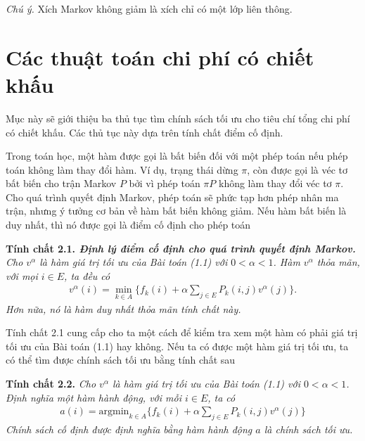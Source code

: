 \documentclass[12pt,a4paper]{report}
\begin{document}
   \textit{Chú ý.} Xích Markov không giảm là xích chỉ có một lớp liên thông.
  
	\chapter{Các thuật toán chi phí có chiết khấu}	
    Mục này sẽ giới thiệu ba thủ tục tìm chính sách tối ưu cho tiêu chí tổng chi phí có chiết khấu. Các thủ tục này dựa trên tính chất điểm cố định.
    
    Trong toán học, một hàm được gọi là bất biến đối với một phép toán nếu phép toán không làm thay đổi hàm. Ví dụ, trạng thái dừng $\pi$, còn được gọi là véc tơ bất biến cho trận Markov $P$ bởi vì phép toán $\pi P$ không làm thay đổi véc tơ $\pi$. Cho quá trình quyết định Markov, phép toán sẽ phức tạp hơn phép nhân ma trận, nhưng ý tưởng cơ bản về hàm bất biến không giảm. Nếu hàm bất biến là duy nhất, thì nó được gọi là điểm cố định cho phép toán 
    
    \medskip
    \begin{shaded*}
    	\noindent
     \noindent
    \textbf{Tính chất 2.1. \textit{Định lý điểm cố định cho quá trình quyết định Markov.}}\textit{ Cho $v^\alpha$ là hàm giá trị tối ưu của Bài toán (1.1) với $0<\alpha<1$. Hàm $v^\alpha$ thỏa mãn, với mọi $i \in E$, ta đều có
    	\begin{align}
    	v^\alpha (i)=\underset{k \in A} {\min }\{f_k(i)+\alpha \sum_{j \in E}P_k(i,j)v^\alpha(j)\} .
    	\end{align} 
    	Hơn nữa, nó là hàm duy nhất thỏa mãn tính chất này.}
    \end{shaded*}
   
    
    \medskip
    Tính chất 2.1 cung cấp cho ta một cách để kiểm tra xem một hàm có phải giá trị tối ưu của Bài toán (1.1) hay không. Nếu ta có được một hàm giá trị tối ưu, ta có thể tìm được chính sách tối ưu bằng tính chất sau
    
    
    \medskip
    \begin{shaded*}
    \noindent
   \textbf{Tính chất 2.2.} \textit {Cho $v^\alpha$ là hàm giá trị tối ưu của Bài toán (1.1) với $0<\alpha<1$. Định nghĩa một hàm hành động, với mỗi $i\in E$, ta có
   	\begin{align}
   	a(i)=\mathrm{argmin}_{k\in A}\{f_k(i)+\alpha \sum_{j \in E}P_k(i,j)v^\alpha(j)\}
   	\end{align}
   	Chính sách cố định được định nghĩa bằng hàm hành động $a$ là chính sách tối ưu.}
    \end{shaded*}
   
\end{document}
